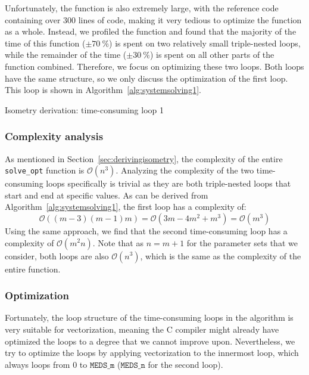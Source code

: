 \documentclass[11pt,a4paper]{report}
\theoremstyle{definition}
\begin{document}
Unfortunately, the function is also extremely large, with the reference code containing over 300 lines of code, making it very tedious to optimize the function as a whole. Instead, we profiled the function and found that the majority of the time of this function ($\pm 70~\%$) is spent on two relatively small triple-nested loops, while the remainder of the time ($\pm 30~\%$) is spent on all other parts of the function combined. Therefore, we focus on optimizing these two loops. Both loops have the same structure, so we only discuss the optimization of the first loop. This loop is shown in Algorithm~\ref{alg:systemsolving1}.

\begin{algorithm}
  \caption{Isometry derivation: time-consuming loop 1}
  \label{alg:systemsolving1}
  
\end{algorithm}

\subsubsection{Complexity analysis}
\label{sec:isometryderivationcomplexity}
As mentioned in Section~\ref{sec:derivingisometry}, the complexity of the entire \texttt{solve\_opt} function is $\mathcal{O}(n^3)$. Analyzing the complexity of the two time-consuming loops specifically is trivial as they are both triple-nested loops that start and end at specific values. As can be derived from Algorithm~\ref{alg:systemsolving1}, the first loop has a complexity of:
\[
  \mathcal{O}((m-3)(m-1)m) = \mathcal{O}(3m - 4m^2 + m^3) = \mathcal{O}(m^3)
\]
Using the same approach, we find that the second time-consuming loop has a complexity of $\mathcal{O}(m^2n)$. Note that as $n = m + 1$ for the parameter sets that we consider, both loops are also $\mathcal{O}(n^3)$, which is the same as the complexity of the entire function.

\subsubsection{Optimization}
\label{sec:isometryderivationoptimization}
Fortunately, the loop structure of the time-consuming loops in the algorithm is very suitable for vectorization, meaning the C compiler might already have optimized the loops to a degree that we cannot improve upon.  Nevertheless, we try to optimize the loops by applying vectorization to the innermost loop, which always loops from $0$ to $\texttt{MEDS\_m}$ ($\texttt{MEDS\_n}$ for the second loop).
\end{document}
